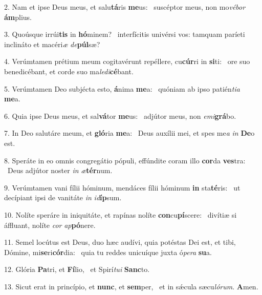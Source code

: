 2. Nam et ipse Deus meus, et salu\textbf{tá}ris \textbf{me}us: \ast\  suscéptor meus, non mo\textit{vé}\textit{bor} \textbf{ám}plius.\

3. Quoúsque irrúi\textbf{tis} in \textbf{hó}minem? \ast\  interfícitis univérsi vos: tamquam paríeti inclináto et macéri\textit{æ} \textit{de}\textbf{púl}sæ?\

4. Verúmtamen prétium meum cogitavérunt repéllere, cu\textbf{cúr}ri in \textbf{si}ti: \ast\  ore suo benedicébant, et corde suo ma\textit{le}\textit{di}\textbf{cé}bant.\

5. Verúmtamen Deo subjécta esto, \textbf{á}nima \textbf{me}a: \ast\  quóniam ab ipso patién\textit{ti}\textit{a} \textbf{me}a.\

6. Quia ipse Deus meus, et sal\textbf{vá}tor \textbf{me}us: \ast\  adjútor meus, non \textit{e}\textit{mi}\textbf{grá}bo.\

7. In Deo salutáre meum, et \textbf{gló}ria \textbf{me}a: \ast\  Deus auxílii mei, et spes me\textit{a} \textit{in} \textbf{De}o est.\

8. Speráte in eo omnis congregátio pópuli, effúndite coram illo \textbf{cor}da \textbf{ves}tra: \ast\  Deus adjútor noster \textit{in} \textit{æ}\textbf{tér}num.\

9. Verúmtamen vani fílii hóminum, mendáces fílii hóminum \textbf{in} sta\textbf{té}ris: \ast\  ut decípiant ipsi de vanitáte \textit{in} \textit{id}\textbf{íp}sum.\

10. Nolíte speráre in iniquitáte, et rapínas nolíte \textbf{con}cu\textbf{pí}scere: \ast\  divítiæ si áffluant, nolíte \textit{cor} \textit{ap}\textbf{pó}nere.\

11. Semel locútus est Deus, duo hæc audívi, quia potéstas Dei est, et tibi, Dómine, mi\textbf{se}ri\textbf{cór}dia: \ast\  quia tu reddes unicuíque juxta ó\textit{pe}\textit{ra} \textbf{su}a.\

12. Glória \textbf{Pa}tri, et \textbf{Fí}lio, \ast\  et Spirí\textit{tu}\textit{i} \textbf{Sanc}to.\

13. Sicut erat in princípio, et \textbf{nunc}, et \textbf{sem}per, \ast\  et in sǽcula sæcu\textit{ló}\textit{rum}. \textbf{A}men.\

